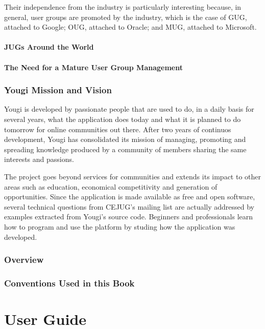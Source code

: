 \documentclass[envcountsame,envcountchap,letterpaper]{svmono}
\begin{document}
Their independence from the industry is particularly interesting because, in general, user groups are promoted by the industry, which is the case of GUG, attached to Google; OUG, attached to Oracle; and MUG, attached to Microsoft.

\subsection{JUGs Around the World}

\subsection{The Need for a Mature User Group Management}

\section{Yougi Mission and Vision}

Yougi is developed by passionate people that are used to do, in a daily basis for several years, what the application does today and what it is planned to do tomorrow for online communities out there. After two years of continuos development, Yougi has consolidated its mission of managing, promoting and spreading knowledge produced by a community of members sharing the same interests and passions.

The project goes beyond services for communities and extends its impact to other areas such as education, economical competitivity and generation of opportunities. Since the application is made available as free and open software, several technical questions from CEJUG's mailing list are actually addressed by examples extracted from Yougi's source code. Beginners and professionals learn how to program and use the platform by studing how the application was developed.

\section{Overview}

\section{Conventions Used in this Book}

\part{User Guide}
\end{document}
